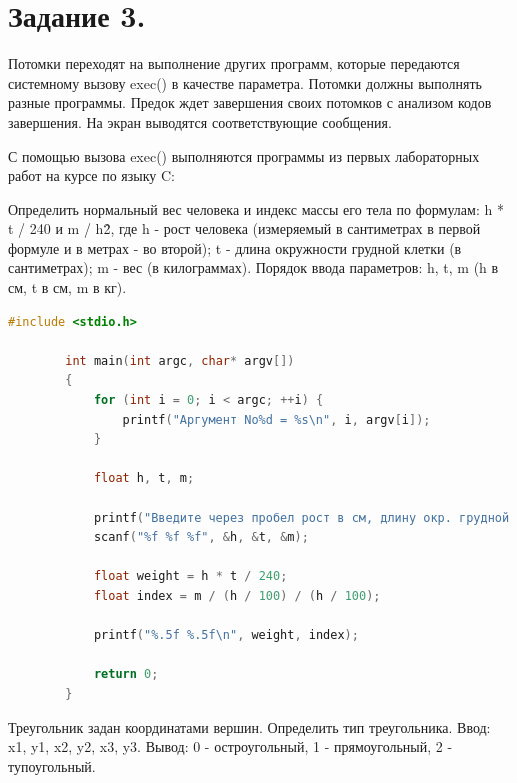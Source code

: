\documentclass[12pt]{report}
\begin{document}
	\section*{Задание 3.}
	Потомки переходят на выполнение других программ, которые передаются
	системному вызову exec() в качестве параметра.
	Потомки должны выполнять разные программы.
	Предок ждет завершения своих потомков с анализом кодов завершения.
	На экран выводятся соответствующие сообщения.
	
	С помощью вызова exec() выполняются программы из первых лабораторных работ
	на курсе по языку C: 
	
	Определить нормальный вес человека и индекс массы его тела по формулам:
	{h * t / 240} и {m / h\^2}, 
	где h - рост человека (измеряемый в сантиметрах в первой формуле и в метрах - во второй);
	t - длина окружности грудной клетки (в сантиметрах); m - вес (в килограммах). 
	Порядок ввода параметров: h, t, m (h в см, t в см, m в кг).
	
	\begin{lstlisting}[label=code:my_test, caption={Код программы weight\_index}, language=C]
		#include <stdio.h>
		
		int main(int argc, char* argv[])
		{
			for (int i = 0; i < argc; ++i) {
				printf("Аргумент No%d = %s\n", i, argv[i]);
			}
			
			float h, t, m;
			
			printf("Введите через пробел рост в см, длину окр. грудной клетки в см и вес в кг:\n");
			scanf("%f %f %f", &h, &t, &m);
			
			float weight = h * t / 240;
			float index = m / (h / 100) / (h / 100);
			
			printf("%.5f %.5f\n", weight, index);
			
			return 0;
		}
	\end{lstlisting}

	Треугольник задан координатами вершин. Определить тип треугольника.
	Ввод: x1, y1, x2, y2, x3, y3.
	Вывод: 0 - остроугольный, 1 - прямоугольный, 2 - тупоугольный.
\end{document}
